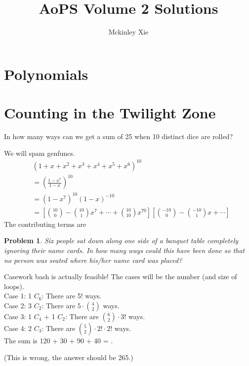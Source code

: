 \documentclass[12pt]{scrartcl}
\title{AoPS Volume 2 Solutions}
\author{Mckinley Xie}
\newtheorem{a_problem}{Problem}
\begin{document}
\maketitle
\tableofcontents
\setcounter{section}{6}
\section{Polynomials}
\setcounter{a_problem}{87}
\setcounter{section}{16}
\section{Counting in the Twilight Zone}
\setcounter{exercise}{9}
\begin{exercise}
	In how many ways can we get a sum of 25 when 10 distinct dice are rolled?
\end{exercise}
\begin{soln}
	We will spam genfuncs. 
	\begin{align*}
		& (1+x+x^2+x^3+x^4+x^5+x^6)^{10} \\
		&= \left(\frac{1-x^7}{1-x}\right)^{10} \\
	    &= \left(1-x^7\right)^{10}\left(1-x\right)^{-10} \\
		&= \left[\binom{10}0 - \binom{10}1x^7 + \cdots + 
		\binom{10}{10}x^{70}\right]
		\left[\binom{-10}{0}-\binom{-10}{1}x + \cdots\right]
	\end{align*}
	The contributing terms are

\end{soln}
\setcounter{a_problem}{292}
\begin{a_problem}
	Six people sat down along one side of a banquet table completely 
	ignoring their name cards. In how many ways could this have been
	done so that no person was seated where his/her name card was
	placed?
\end{a_problem}
\begin{soln}
	Casework bash is actually feasible! The cases will be the number (and 
	size of loops). \\
	Case 1: 1 $C_6$: There are 5! ways. \\
	Case 2: 3 $C_2$: There are $5 \cdot \binom42$ ways. \\
	Case 3: 1 $C_4$ + 1 $C_2$: There are $\binom62 \cdot 3!$ ways. \\
	Case 4: 2 $C_3$: There are $\binom52 \cdot 2! \cdot 2!$ ways. \\
	The sum is 120 + 30 + 90 + 40 = .
\end{soln}
	(This is wrong, the answer should be 265.)
\setcounter{section}{19}
\end{document}
